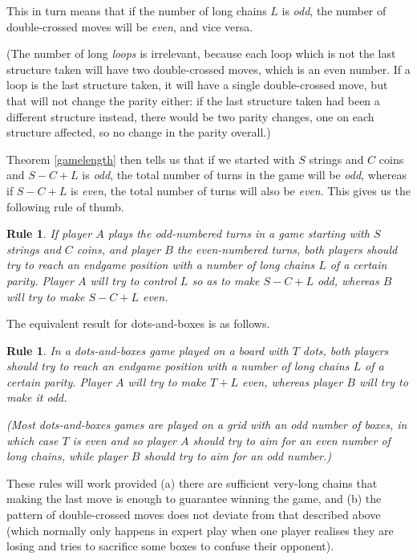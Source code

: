 \documentclass[a4paper,twocolumn]{article}
\newtheorem{parityruleofthumb}[thm]{Rule}
\newtheorem{dnbparityruleofthumb}[thm]{Rule}
\begin{document}
This in turn means that if the number of long chains $L$ is
\emph{odd}, the number of double-crossed moves will be \emph{even},
and vice versa.

(The number of long \emph{loops} is irrelevant, because each loop
which is not the last structure taken will have two double-crossed
moves, which is an even number. If a loop is the last structure taken,
it will have a single double-crossed move, but that will not change
the parity either: if the last structure taken had been a different
structure instead, there would be two parity changes, one on each
structure affected, so no change in the parity overall.)

Theorem \ref{gamelength} then tells us that if we started with $S$
strings and $C$ coins and $S-C+L$ is \emph{odd}, the total number of
turns in the game will be \emph{odd}, whereas if $S-C+L$ is
\emph{even}, the total number of turns will also be \emph{even}. This
gives us the following rule of thumb.

\begin{parityruleofthumb}\label{parityruleofthumb}
  If player $A$ plays the odd-numbered turns in a game starting with
  $S$ strings and $C$ coins, and player $B$ the even-numbered turns,
  both players should try to reach an endgame position with a number
  of long chains $L$ of a certain parity. Player $A$ will try to
  control $L$ so as to make $S-C+L$ \emph{odd}, whereas $B$ will try
  to make $S-C+L$ \emph{even}.
\end{parityruleofthumb}

The equivalent result for dots-and-boxes is as follows.

\begin{dnbparityruleofthumb}\label{dnbparityruleofthumb}
  In a dots-and-boxes game played on a board with $T$ dots, both
  players should try to reach an endgame position with a number of
  long chains $L$ of a certain parity. Player $A$ will try to make
  $T+L$ \emph{even}, whereas player $B$ will try to make it
  \emph{odd}.

  (Most dots-and-boxes games are played on a grid with an odd number
  of boxes, in which case $T$ is even and so player $A$ should try to
  aim for an even number of long chains, while player $B$ should try
  to aim for an odd number.)
\end{dnbparityruleofthumb}

These rules will work provided (a) there are sufficient very-long
chains that making the last move is enough to guarantee winning the
game, and (b) the pattern of double-crossed moves does not deviate
from that described above (which normally only happens in expert play
when one player realises they are losing and tries to sacrifice some
boxes to confuse their opponent).
\end{document}

